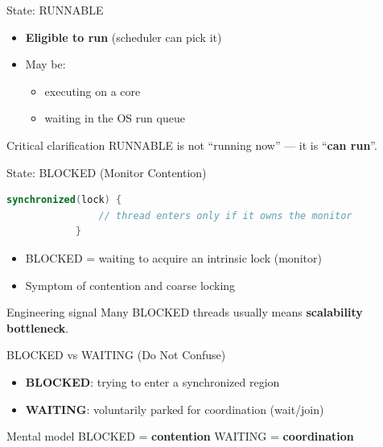 \documentclass[aspectratio=169,11pt]{beamer}
\begin{document}
	\begin{frame}{State: RUNNABLE}
		\begin{itemize}
			\item \textbf{Eligible to run} (scheduler can pick it)
			\item May be:
			\begin{itemize}
				\item executing on a core
				\item waiting in the OS run queue
			\end{itemize}
		\end{itemize}
		
		\vspace{3mm}
		\begin{block}{Critical clarification}
			RUNNABLE is not “running now” — it is “\textbf{can run}”.
		\end{block}
	\end{frame}
	
	\begin{frame}[fragile]{State: BLOCKED (Monitor Contention)}
		\begin{lstlisting}[language=Java]
			synchronized(lock) {
				// thread enters only if it owns the monitor
			}
		\end{lstlisting}
		
		\begin{itemize}
			\item BLOCKED = waiting to acquire an intrinsic lock (monitor)
			\item Symptom of contention and coarse locking
		\end{itemize}
		
		\vspace{3mm}
		\begin{block}{Engineering signal}
			Many BLOCKED threads usually means \textbf{scalability bottleneck}.
		\end{block}
	\end{frame}
	
	\begin{frame}{BLOCKED vs WAITING (Do Not Confuse)}
		\begin{itemize}
			\item \textbf{BLOCKED}: trying to enter a synchronized region
			\item \textbf{WAITING}: voluntarily parked for coordination (wait/join)
		\end{itemize}
		
		\vspace{4mm}
		\begin{block}{Mental model}
			BLOCKED = \textbf{contention} \qquad WAITING = \textbf{coordination}
		\end{block}
	\end{frame}
	
\end{document}
